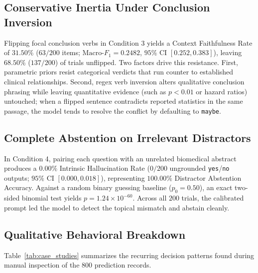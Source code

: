 \documentclass[10pt,twocolumn,letterpaper]{article}
\begin{document}
\subsection{Conservative Inertia Under Conclusion Inversion}
Flipping focal conclusion verbs in Condition 3 yields a Context Faithfulness Rate of $31.50\%$ ($63/200$ items; $\text{Macro-}F_1 = 0.2482$, $95\%$ CI $[0.252, 0.383]$), leaving $68.50\%$ ($137/200$) of trials unflipped. Two factors drive this resistance. First, parametric priors resist categorical verdicts that run counter to established clinical relationships. Second, regex verb inversion alters qualitative conclusion phrasing while leaving quantitative evidence (such as $p < 0.01$ or hazard ratios) untouched; when a flipped sentence contradicts reported statistics in the same passage, the model tends to resolve the conflict by defaulting to \texttt{maybe}.

\subsection{Complete Abstention on Irrelevant Distractors}
In Condition 4, pairing each question with an unrelated biomedical abstract produces a $0.00\%$ Intrinsic Hallucination Rate ($0/200$ ungrounded \texttt{yes}/\texttt{no} outputs; $95\%$ CI $[0.000, 0.018]$), representing $100.00\%$ Distractor Abstention Accuracy. Against a random binary guessing baseline ($p_0 = 0.50$), an exact two-sided binomial test yields $p = 1.24 \times 10^{-60}$. Across all $200$ trials, the calibrated prompt led the model to detect the topical mismatch and abstain cleanly.

\subsection{Qualitative Behavioral Breakdown}
Table~\ref{tab:case_studies} summarizes the recurring decision patterns found during manual inspection of the $800$ prediction records.
\end{document}
